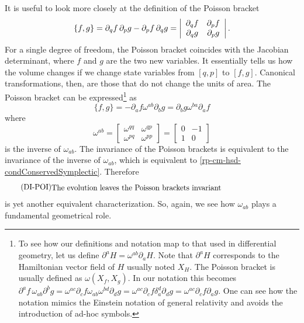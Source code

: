 
It is useful to look more closely at the definition of the Poisson bracket
\begin{equation}
	\{f, g\} = \partial_q f \, \partial_p g - \partial_p f \, \partial_q g = \left|\begin{array}{ c c }
		\partial_q f & \partial_p f \\
		\partial_q g & \partial_p g \\
	\end{array} \right|.
\end{equation}
For a single degree of freedom, the Poisson bracket coincides with the Jacobian determinant, where $f$ and $g$ are the two new variables. It essentially tells us how the volume changes if we change state variables from $[q, p]$ to $[f, g]$. Canonical transformations, then, are those that do not change the units of area. The Poisson bracket can be expressed\footnote{To see how our definitions and notation map to that used in differential geometry, let us define $\partial^a H = \omega^{ab} \partial_a H$. Note that $\partial^a H$ corresponds to the Hamiltonian vector field of $H$ usually noted $X_H$. The Poisson bracket is usually defined as $\omega(X_f, X_g)$. In our notation this becomes $\partial^a f \, \omega_{ab} \partial^b g = \omega^{ac} \partial_c f \omega_{ab} \omega^{bd} \partial_d g = \omega^{ac} \partial_c f \delta_a^d \partial_d g = \omega^{ac} \partial_c f \partial_a g$. One can see how the notation mimics the Einstein notation of general relativity and avoids the introduction of ad-hoc symbols.} as
\begin{equation}
	\{f, g\} = - \partial_a f \omega^{ab} \partial_b g = \partial_b g \omega^{ba} \partial_a f
\end{equation}
where 
\begin{equation}
	\omega^{ab} = \left[\begin{array}{cc}
		\omega^{qq} & \omega^{qp} \\
		\omega^{pq} & \omega^{pp} 
	\end{array} \right]= \left[\begin{array}{cc}
		0 & -1 \\
		1 & 0 
	\end{array} \right]
\end{equation}
is the inverse of $\omega_{ab}$. The invariance of the Poisson brackets is equivalent to the invariance of the inverse of $\omega_{ab}$, which is equivalent to \ref{rp-cm-hsd-condConservedSymplectic}. Therefore
\begin{equation}\label{rp-cm-hsd-condConservedPoisson}
	\tag{DI-POI}
	\eqtext{The evolution leaves the Poisson brackets invariant}
\end{equation}
is yet another equivalent characterization. So, again, we see how $\omega_{ab}$ plays a fundamental geometrical role.

